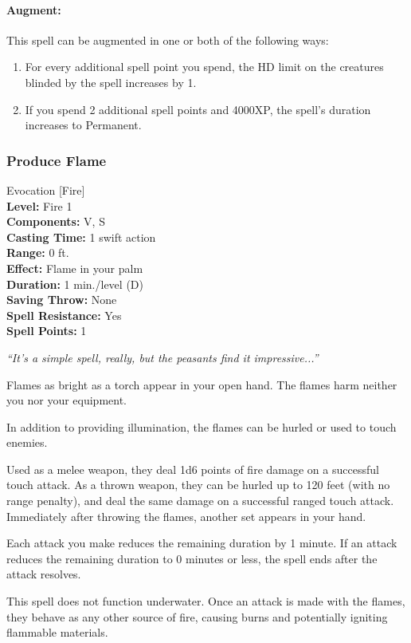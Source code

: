 \paragraph{Augment:} This spell can be augmented in one or both of the following ways:
\begin{enumerate}
 \item For every additional spell point you spend, the HD limit on the creatures blinded by the spell increases by 1.
 \item If you spend 2 additional spell points and 4000XP, the spell's duration increases to Permanent.
\end{enumerate}
\subsubsection{Produce Flame}
\label{Spell:ProduceFlame}
Evocation [Fire]
\\ \textbf{Level:} Fire 1
\\ \textbf{Components:} V, S
\\ \textbf{Casting Time:} 1 swift action
\\ \textbf{Range:} 0 ft.
\\ \textbf{Effect:} Flame in your palm
\\ \textbf{Duration:} 1 min./level (D)
\\ \textbf{Saving Throw:} None
\\ \textbf{Spell Resistance:} Yes
\\ \textbf{Spell Points:} 1

\emph{``It's a simple spell, really, but the peasants find it impressive...''}

Flames as bright as a torch appear in your open hand. The flames harm neither you nor your equipment.

In addition to providing illumination, the flames can be hurled or used to touch enemies. 

Used as a melee weapon, they deal 1d6 points of fire damage on a successful touch attack.
As a thrown weapon, they can be hurled up to 120 feet (with no range penalty), and deal the same damage on a successful ranged touch attack. Immediately after throwing the flames, another set appears in your hand.

Each attack you make reduces the remaining duration by 1 minute. 
If an attack reduces the remaining duration to 0 minutes or less, the spell ends after the attack resolves.

This spell does not function underwater. Once an attack is made with the flames, they behave as any other source of fire, causing burns and potentially igniting flammable materials.


